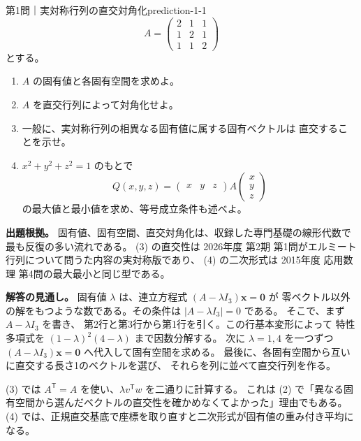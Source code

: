 \begin{problem}{第1問｜実対称行列の直交対角化}{prediction-1-1}
\[
A=\begin{pmatrix}
2&1&1\\
1&2&1\\
1&1&2
\end{pmatrix}
\]
とする。
\begin{enumerate}
  \item[(1)] $A$ の固有値と各固有空間を求めよ。
  \item[(2)] $A$ を直交行列によって対角化せよ。
  \item[(3)] 一般に、実対称行列の相異なる固有値に属する固有ベクトルは
  直交することを示せ。
  \item[(4)] $x^2+y^2+z^2=1$ のもとで
  \[
  Q(x,y,z)=
  \begin{pmatrix}x&y&z\end{pmatrix}
  A
  \begin{pmatrix}x\\y\\z\end{pmatrix}
  \]
  の最大値と最小値を求め、等号成立条件も述べよ。
\end{enumerate}
\end{problem}
\begin{memo*}
\textbf{出題根拠。}
固有値、固有空間、直交対角化は、収録した専門基礎の線形代数で最も反復の多い流れである。
(3) の直交性は 2026年度 第2期 第1問がエルミート行列について問うた内容の実対称版であり、
(4) の二次形式は 2015年度 応用数理 第4問の最大最小と同じ型である。

\textbf{解答の見通し。}
固有値 $\lambda$ は、連立方程式
$(A-\lambda I_3)\boldsymbol{x}=\boldsymbol{0}$ が
零ベクトル以外の解をもつような数である。その条件は
$|A-\lambda I_3|=0$ である。
そこで、まず $A-\lambda I_3$ を書き、
第2行と第3行から第1行を引く。この行基本変形によって
特性多項式を $(1-\lambda)^2(4-\lambda)$ まで因数分解する。
次に $\lambda=1,4$ を一つずつ
$(A-\lambda I_3)\boldsymbol{x}=\boldsymbol{0}$ へ代入して固有空間を求める。
最後に、各固有空間から互いに直交する長さ1のベクトルを選び、
それらを列に並べて直交行列を作る。

(3) では $A^{\mathsf T}=A$ を使い、$\lambda v^{\mathsf T}w$ を二通りに計算する。
これは (2) で「異なる固有空間から選んだベクトルの直交性を確かめなくてよかった」理由でもある。
(4) では、正規直交基底で座標を取り直すと二次形式が固有値の重み付き平均になる。
\end{memo*}
